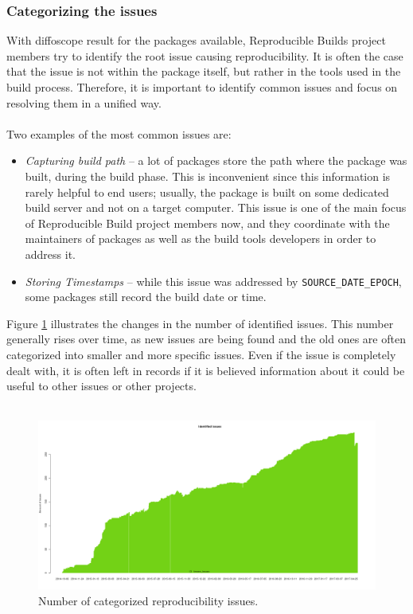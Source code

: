 {\subsubsection[Categorizing the issues]{Categorizing the issues} 
With diffoscope result for the packages available, Reproducible Builds project members try to identify the root issue causing reproducibility. It is often the case that the issue is not within the package itself, but rather in the tools used in the build process. Therefore, it is important to identify common issues and focus on resolving them in a unified way.\\\\
Two examples of the most common issues are:
\begin{itemize}[noitemsep]
\item \textit{Capturing build path} -- a lot of packages store the path where the package was built, during the build phase. This is inconvenient since this information is rarely helpful to end users; usually, the package is built on some dedicated build server and not on a target computer. This issue is one of the main focus of Reproducible Build project members now, and they coordinate with the maintainers of packages as well as the build tools developers in order to address it.
\item \textit{Storing Timestamps} -- while this issue was addressed by \texttt{SOURCE\_DATE\_EPOCH}, some packages still record the build date or time.
\end{itemize}
Figure \ref{fig:stats_issues} illustrates the changes in the number of identified issues. This number generally rises over time, as new issues are being found and the old ones are often categorized into smaller and more specific issues. Even if the issue is completely dealt with, it is often left in records if it is believed information about it could be useful to other issues or other projects.\\\\
\FloatBarrier

\begin{figure}[h]
\centering
\includegraphics[width=1.05\textwidth]{fig/stats_issues.png}
\caption{\label{fig:stats_issues}Number of categorized reproducibility issues. \autocite{tests-rbo}}
\end{figure}

}
